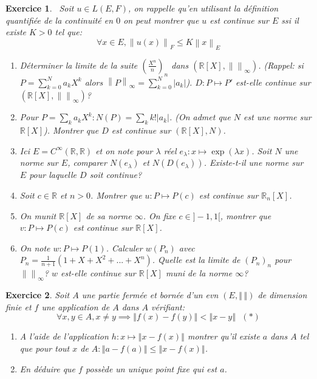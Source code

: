 \documentclass[12pt,a4paper]{article}
\newcommand{\norme}[1]{\left\lVert#1\right\rVert}
\newcommand{\R}{\mathbb{R}}
\theoremstyle{break}
\theoremstyle{break}
\newtheorem{Exo}{Exercice}
\begin{document}

\begin{Exo}\ 
		Soit $u\in L(E,F)$, on rappelle qu'en utilisant la définition quantifiée de la continuité en $0$ on peut montrer que $u$ est continue sur $E$ ssi il existe $K>0$ tel que:
		$$\forall x\in E,\norme{u(x)}_F\leqslant K\norme{x}_E$$
	\begin{enumerate}
		\item
		Déterminer la  limite de la suite $\left(\frac{X^n}{n}\right)_n$ dans $(\R[X],\norme{}_{\infty})$. (Rappel: si $P=\sum_{k=0}^{N}a_kX^k$ alors $\norme{P}_{\infty}=\sum_{k=0}^N|a_k|$).
		$D:P\mapsto P'$ est-elle continue sur $(\R[X],\norme{}_{\infty})$?\item
		Pour $P=\sum_k a_kX^k:N(P)=\sum_k k!|a_k|$. (On admet que $N$ est une norme sur $\R[X]$). Montrer que $D$ est continue sur $(\R[X],N)$.
		\item
		Ici $E=C^{\infty}(\R,\R)$ et on note pour $\lambda$ réel $e_{\lambda}:x\mapsto \exp(\lambda x)$. Soit $N$ une norme sur $E$, comparer $N(e_{\lambda})$ et $N(D(e_{\lambda}))$. Existe-t-il une norme sur $E$ pour laquelle $D$ soit continue?
		\item
		Soit $c\in\R$ et $n>0$. Montrer que $u:P\mapsto P(c)$ est continue sur $\R_n[X]$.
		\item
		On munit $\R[X]$ de sa norme $\infty$. On fixe $c\in]-1,1[$, montrer que $v:P\mapsto P(c)$ est continue sur $\R[X]$.
		\item On note	$w:P\mapsto P(1)$. Calculer $w(P_n)$ avec $P_n=\frac{1}{n+1}(1+X+X^2+...+X^n)$. Quelle est la limite de $(P_n)_n$ pour $\norme{ }_{\infty}$? $w$ est-elle continue sur $\R[X]$ muni de la norme $\infty$?
	\end{enumerate}
	
\end{Exo}



\begin{Exo}
	 Soit $A$ une partie fermée et bornée d'un evn $\left( E,\left\Vert
\,\right\Vert \right)$ de dimension finie et $f$ une application de $A$ dans $A$ vérifiant: 
\begin{equation*}
	\forall x,y\in A,x\neq y\implies \left\Vert f(x)-f(y)\right\Vert
	<\left\Vert x-y\right\Vert \text{ }(\ast )
\end{equation*}


\begin{enumerate}
	\item A l'aide de l'application $h:x\mapsto \left\Vert x-f(x)\right\Vert $	montrer qu'il existe $a$ dans $A$ tel que pour tout $x$ de $A:\left\Vert
	a-f(a)\right\Vert \leqslant \left\Vert x-f(x)\right\Vert$.
	
	\item En déduire que $f$ possède un unique point fixe qui est $a$.

\end{enumerate}
\end{Exo}
\end{document}
